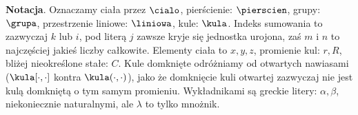 \textbf{Notacja}.
Oznaczamy ciała przez $\cialo$, pierścienie: $\pierscien$, grupy: $\grupa$, przestrzenie liniowe: $\liniowa$, kule: $\kula$.
Indeks sumowania to zazwyczaj $k$ lub $i$, pod literą $j$ zawsze kryje się jednostka urojona, zaś $m$ i $n$ to najczęściej jakieś liczby całkowite.
Elementy ciała to $x, y, z$, promienie kul: $r, R$, bliżej nieokreślone stałe: $C$.
Kule domknięte odróżniamy od otwartych nawiasami ($\kula[\cdot, \cdot]$ kontra $\kula(\cdot, \cdot)$), jako że domknięcie kuli otwartej zazwyczaj nie jest kulą domkniętą o tym samym promieniu.
Wykładnikami są greckie litery: $\alpha, \beta$, niekoniecznie naturalnymi, ale $\lambda$ to tylko mnożnik.
